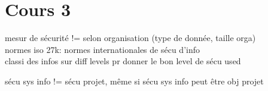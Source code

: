 \section{Cours 3}
mesur de sécurité != selon organisation (type de donnée, taille orga)\\
normes iso 27k: normes internationales de sécu d'info\\
classi des infos sur diff levels pr donner le bon level de sécu used

sécu sys info != sécu projet, même si sécu sys info peut être obj projet
